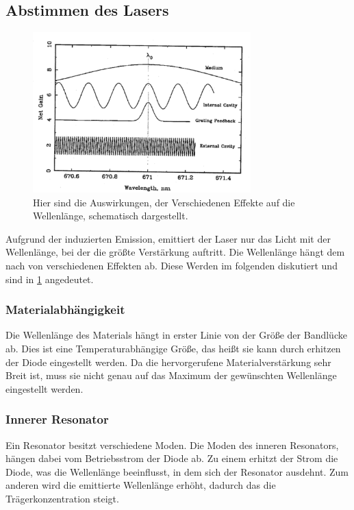 \subsection{Abstimmen des Lasers}
\begin{figure}[h!]
	\centering
	\includegraphics[width = 0.75\textwidth , angle = 1]{../Grafiken/Photon_Gain_Wellenlaenge_Beitraege.pdf}
	\caption{Hier sind die Auswirkungen, der Verschiedenen Effekte auf die Wellenlänge, schematisch dargestellt.\cite{V60}\label{fig:Photon_Gain_Wellenlaenge_Beitraege}}
\end{figure}
Aufgrund der induzierten Emission, emittiert der Laser nur das Licht mit der Wellenlänge, bei der die größte Verstärkung auftritt.
Die Wellenlänge hängt dem nach von verschiedenen Effekten ab.
Diese Werden im folgenden diskutiert und sind in \cref{fig:Photon_Gain_Wellenlaenge_Beitraege} angedeutet.
\subsubsection{Materialabhängigkeit}
Die Wellenlänge des Materials hängt in erster Linie von der Größe der Bandlücke ab.
Dies ist eine Temperaturabhängige Größe, das heißt sie kann durch erhitzen der Diode eingestellt werden.
Da die hervorgerufene Materialverstärkung sehr Breit ist, muss sie nicht genau auf das Maximum der gewünschten Wellenlänge eingestellt werden.
\subsubsection{Innerer Resonator}
Ein Resonator besitzt verschiedene Moden.
Die Moden des inneren Resonators, hängen dabei vom Betriebsstrom der Diode ab.
Zu einem erhitzt der Strom die Diode, was die Wellenlänge beeinflusst, in dem sich der Resonator ausdehnt.
Zum anderen wird die emittierte Wellenlänge erhöht, dadurch das die Trägerkonzentration steigt.
